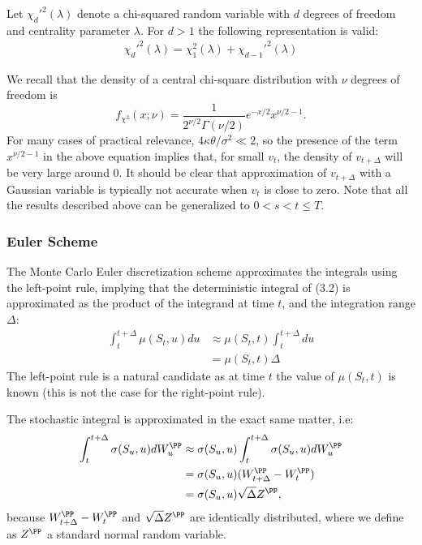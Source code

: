 \documentclass[11pt]{article}
\numberwithin{equation}{section}
\begin{document}
\begin{proposition}
    Let $\chi_d'^2(\lambda)$ denote a chi-squared random variable with $d$ degrees of
    freedom and centrality parameter $\lambda$. For $d>1$ the following
    representation is valid:
    \begin{align*}
        \chi_d'^2(\lambda)= \chi_1^2(\lambda)+\chi_{d-1}'^2(\lambda)
    \end{align*}
\end{proposition}
We recall that the density of a central chi-square distribution with $\nu$ degrees of freedom is
\begin{equation*}
f_{\chi^{2}}(x ; \nu)=\frac{1}{2^{\nu / 2} \Gamma(\nu / 2)} e^{-x / 2} x^{\nu / 2-1}.
\end{equation*}
For many cases of practical relevance, $4 \kappa \theta / \sigma^{2} \ll
2$, so the presence of the term $x^{\nu / 2-1}$ in the above equation implies that, for small
$v_t$, the density of $v_{t+\Delta}$ will be very large around 0. It should be clear that approximation of $v_{t+\Delta}$
with a Gaussian variable is typically not accurate when $v_t$ is close to zero. Note that all the results described above can be generalized to $0<s<t\leq T$.
\subsubsection{Euler Scheme}
The Monte Carlo Euler discretization scheme approximates the integrals using the
left-point rule, implying that the deterministic integral of (3.2) is
approximated as the product of the
integrand at time $t$, and the integration range $\Delta$:
\begin{align*}
    \int_t^{t+\Delta}\mu (S_t,u)du&\approx\mu(S_t,t)\int_t^{t+\Delta}du\\
    &=\mu(S_t,t)\Delta
\end{align*}
The left-point rule is a natural candidate as at time $t$ the value of
$\mu(S_t,t)$ is known (this is not the case for the right-point rule).

The stochastic integral is approximated in the exact same matter, i.e:
\begin{align*}
    \int_t^{t+\Delta}\sigma(S_u,u)dW_u^\PP&\approx \sigma(S_u,u) \int_t^{t+\Delta}\sigma(S_u,u)dW_u^\PP\\
    &=\sigma(S_u,u)(W_{t+\Delta}^\PP-W_t^\PP)\\
    &=\sigma(S_u,u)\sqrt{\Delta}Z^\PP,
\end{align*}
because $W_{t+\Delta}^\PP-W_t^\PP$ and $\sqrt{\Delta}Z^\PP$ are identically distributed,
where we define as $Z^\PP$ a standard normal random variable.
\end{document}
